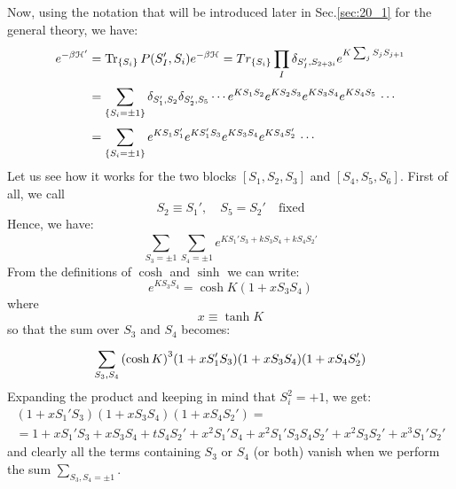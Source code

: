 \documentclass[../main/main.tex]{subfiles}
\begin{document}
Now, using the notation that will be introduced later in Sec.\ref{sec:20_1} for the general theory, we have:
\begin{equation}
\begin{split}
  e^{-\beta \mathcal{H}' }&= \Tr_{\{ S_i \}  } P(S_{I}',S_{i})e^{-\beta {\mathcal {H}}} =  Tr_{\{ S_i \}  } \prod_{I}^{}  \delta _{S_{I}',S_{2+3i}} e^{K \sum_{j}^{} S_j S_{j+1} }  \\
  & = \sum_{\{ S_i = \pm1 \}  }^{}  \delta _{S_{1}',S_{2}}\delta _{S_{2}',S_{5}}\cdots e^{KS_{1}S_{2}}e^{KS_{2}S_{3}}e^{KS_{3}S_{4}}e^{KS_{4}S_{5}}\,\cdots \\
  & = \sum_{\{ S_i = \pm1 \}  }^{} e^{KS_{1}S_{1}'}e^{KS_{1}'S_{3}}e^{KS_{3}S_{4}}e^{KS_{4}S_{2}'} \,\cdots
\end{split}
\end{equation}
Let us see how it works for the two blocks \( [S_1,S_2,S_3] \) and \( [S_4,S_5,S_6] \). First of all, we call
\begin{equation*}
  S_2 \equiv S_1', \quad S_5 = S_2' \quad \text{fixed}
\end{equation*}
Hence, we have:
\begin{equation*}
  \sum_{S_3 = \pm 1}^{}   \sum_{S_4 = \pm 1}^{}  e^{ K S_1' S_3 + k S_3 S_4 + k S_4 S_2'}
\end{equation*}
From the definitions of \( \cosh \) and \( \sinh \) we can write:
\begin{equation}
  e^{K S_3 S_4}  = \cosh K ( 1 + x S_3 S_4)
  \label{eq:20_13}
\end{equation}
where
\begin{equation*}
  x \equiv \tanh K
\end{equation*}
so that the sum over \( S_3 \) and \( S_4 \)  becomes:
\begin{equation*}
  \sum_{S_3,S_4}^{} \qty(\cosh K)^3 \qty(1 + x S_1' S_3) \qty(1 + x S_3 S_4) \qty(1 + x S_4 S_2')
\end{equation*}
Expanding the product and keeping in mind that \( S_i^2 = +1 \), we get:
\begin{equation*}
  \begin{aligned}
    (1+xS_{1}'S_{3})(1+xS_{3}S_{4})(1+xS_{4}S_{2}')=\\
    =1+xS_{1}'S_{3}+xS_{3}S_{4}+tS_{4}S_{2}'+x^{2}S_{1}'S_{4}+x^{2}S_{1}'S_{3}S_{4}S_{2}'+x^{2}S_{3}S_{2}'+x^{3}S_{1}'S_{2}'
  \end{aligned}
\end{equation*}
and clearly all the terms containing \( S_3 \)  or \( S_4 \)  (or both) vanish when we perform the sum \( \sum _{S_{3},S_{4}=\pm 1} \).
\end{document}
